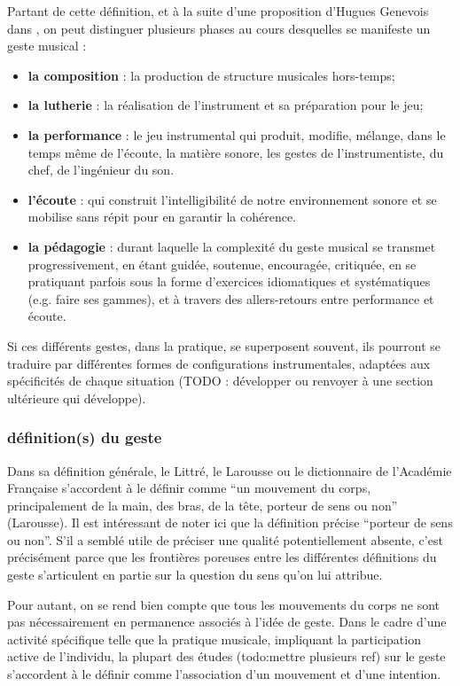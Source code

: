 Partant de cette définition, et à la suite d'une proposition d'Hugues Genevois dans \cite{genevois_geste_1999}, on peut distinguer plusieurs phases au cours desquelles se manifeste un geste musical :

\vspace{-1em}
\begin{itemize}[noitemsep]
\item \textbf{la composition} : la production de structure musicales hors-temps;
\item \textbf{la lutherie} : la réalisation de l'instrument et sa préparation pour le jeu;
\item \textbf{la performance} : le jeu instrumental qui produit, modifie, mélange, dans le temps même de l'écoute, la matière sonore, les gestes de l'instrumentiste, du chef, de l'ingénieur du son.
\item \textbf{l'écoute} : qui construit l'intelligibilité de notre environnement sonore et se mobilise sans répit pour en garantir la cohérence.
\item \textbf{la pédagogie} : durant laquelle la complexité du geste musical se transmet progressivement, en étant guidée, soutenue, encouragée, critiquée, en se pratiquant parfois sous la forme d'exercices idiomatiques et systématiques (e.g. faire ses gammes), et à travers des allers-retours entre performance et écoute.
\end{itemize}

Si ces différents gestes, dans la pratique, se superposent souvent, ils pourront se traduire par différentes formes de configurations instrumentales, adaptées aux spécificités de chaque situation (TODO : développer ou renvoyer à une section ultérieure qui développe).


\subsubsection{définition(s) du geste}
Dans sa définition générale, le Littré, le Larousse ou le dictionnaire de l'Académie Française s'accordent à le définir comme ``un mouvement du corps, principalement de la main, des bras, de la tête, porteur de sens ou non'' (Larousse). Il est intéressant de noter ici que la définition précise ``porteur de sens ou non''. S'il a semblé utile de préciser une qualité potentiellement absente, c'est précisément parce que les frontières poreuses entre les différentes définitions du geste s'articulent en partie sur la question du sens qu'on lui attribue.

Pour autant, on se rend bien compte que tous les mouvements du corps ne sont pas nécessairement en permanence associés à l'idée de geste. Dans le cadre d'une activité spécifique telle que la pratique musicale, impliquant la participation active de l'individu, la plupart des études (todo:mettre plusieurs ref) sur le geste s'accordent à le définir comme l'association d'un mouvement et d'une intention.

